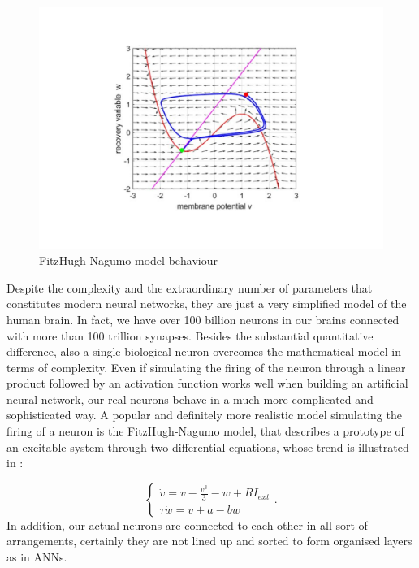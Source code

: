 \documentclass[12pt,a4paper]{report}
\theoremstyle{definition}
\begin{document}
\begin{figure}[h]
    \centering
    \includegraphics[width=0.5\linewidth, trim={4.5cm 2.3cm 5.2cm 2.3cm}, clip,]{./Images/Fitzhugh-nagumo.pdf}
    \caption{FitzHugh-Nagumo model behaviour}
    \label{fig:Fitzhugh-nagumo}
\end{figure}
Despite the complexity and the extraordinary number of parameters that constitutes modern neural networks, they are just a very simplified model of the human brain.
In fact, we have over 100 billion neurons in our brains connected with more than 100 trillion synapses.
Besides the substantial quantitative difference, also a single biological neuron overcomes the mathematical model in terms of complexity.
Even if simulating the firing of the neuron through a linear product followed by an activation function works well when building an artificial neural network, our real neurons behave in a much more complicated and sophisticated way.
A popular and definitely more realistic model simulating the firing of a neuron is the FitzHugh-Nagumo model, that describes a prototype of an excitable system through two differential equations, whose trend is illustrated in :

\begin{equation}
    \begin{cases}
    \dot{v} = v - \frac{v^3}{3} - w + RI_{ext} \\
    \tau \dot{w} = v + a - b w
    \end{cases}.
    \label{eq:fitzhugh-nagumo}
\end{equation}
In addition, our actual neurons are connected to each other in all sort of arrangements, certainly they are not lined up and sorted to form organised layers as in ANNs.

\end{document}
